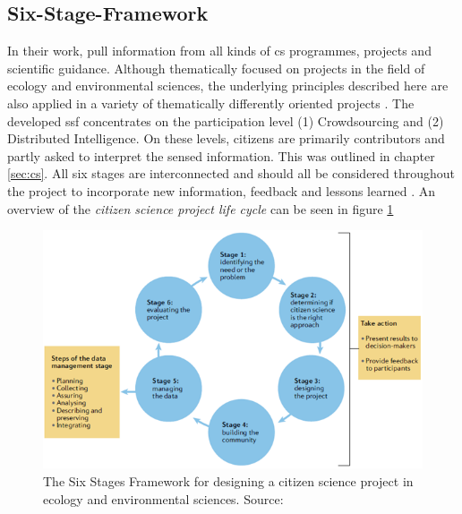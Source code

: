 \subsection{Six-Stage-Framework}\label{subsec:ssf}

In their work, \autocite{fraislCitizenScienceEnvironmental2022} pull information from all kinds of \acrshort{cs} programmes, projects and scientific guidance. Although thematically focused on projects in the field of ecology and environmental sciences, the underlying principles described here are also applied in a variety of thematically differently oriented projects \autocite{fraislCitizenScienceEnvironmental2022}. The developed \acrfull{ssf} concentrates on the participation level (1) Crowdsourcing and (2) Distributed Intelligence. On these levels, citizens are primarily contributors and partly asked to interpret the sensed information. This was outlined in chapter \ref{sec:cs}. All six stages are interconnected and should all be considered throughout the project to incorporate new information, feedback and lessons learned \autocite{fraislCitizenScienceEnvironmental2022}. An overview of the \textit{citizen science project life cycle} can be seen in figure \ref{fig:meth_ssf}

\begin{figure}[!htp]
    \centering
    \includegraphics[width=1.0\textwidth]{figures/2023_MA_methods_ssf_original.png}
    \decoRule
    \caption[The Six Stages Framework]{The Six Stages Framework for designing a citizen science project in ecology and environmental sciences. Source: \autocite[4]{fraislCitizenScienceEnvironmental2022}}%
    \label{fig:meth_ssf}
\end{figure}


